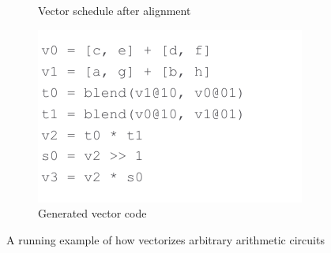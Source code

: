 \begin{figure}
\begin{subfigure}{0.55\columnwidth}
        \vspace{-1em}
        \caption{Vector schedule after alignment}
        \label{fig:aligned-schedule}
    \end{subfigure}
    \begin{subfigure}{0.4\columnwidth}
        \centering
        \includegraphics[width=0.9\linewidth]{figures/compilation_overview/generated_vector_ir.drawio.pdf}
        \vspace{-1em}
        \caption{Generated vector code}
        \label{fig:generated-code}
    \end{subfigure}
    \caption{A running example of how \system vectorizes arbitrary arithmetic circuits}
    \label{fig:toy-running-example}
\end{figure}

